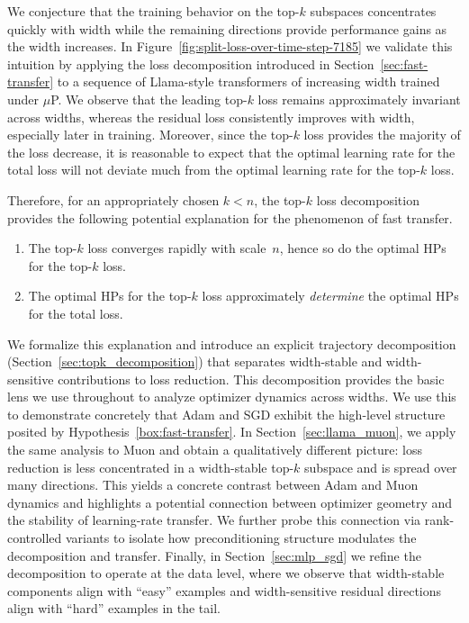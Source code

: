 We conjecture that the training behavior on the top-$k$ subspaces concentrates quickly with width while the remaining directions provide performance gains as the width increases. In Figure~\ref{fig:split-loss-over-time-step-7185} we validate this intuition by applying the loss decomposition introduced in Section~\ref{sec:fast-transfer} to a sequence of Llama-style transformers of increasing width trained under $\mu$P. We observe that the leading top-$k$ loss remains approximately invariant across widths, whereas the residual loss consistently improves with width, especially later in training. Moreover, since the top-$k$ loss provides the majority of the loss decrease, it is reasonable to expect that the optimal learning rate for the total loss will not deviate much from the optimal learning rate for the top-$k$ loss.  

Therefore, for an appropriately chosen $k < n$, the top-$k$ loss decomposition provides the following potential explanation for the phenomenon of fast transfer. 

\label{box:fast-transfer}
\begin{tcolorbox}[colback=white, colframe=gray,
  title={Hypothesis~\theidea: Fast Transfer via Loss Decomposition}]
\begin{enumerate}[leftmargin=1em,itemsep=0.2em]
    \item The top-$k$ loss converges rapidly with scale~$n$, hence so do the optimal HPs for the top-$k$ loss.
    \item The optimal HPs for the top-$k$ loss approximately \emph{determine} the optimal HPs for the total loss.
\end{enumerate}
\end{tcolorbox}
We formalize this explanation and introduce an explicit trajectory decomposition (Section~\ref{sec:topk_decomposition}) that separates width-stable and width-sensitive contributions to loss reduction. This decomposition provides the basic lens we use throughout to analyze optimizer dynamics across widths. We use this to demonstrate concretely that Adam and SGD exhibit the high-level structure posited by Hypothesis~\ref{box:fast-transfer}. In Section~\ref{sec:llama_muon}, we apply the same analysis to Muon and obtain a qualitatively different picture: loss reduction is less concentrated in a width-stable top-$k$ subspace and is spread over many directions. This yields a concrete contrast between Adam and Muon dynamics and highlights a potential connection between optimizer geometry and the stability of learning-rate transfer. We further probe this connection via rank-controlled variants to isolate how preconditioning structure modulates the decomposition and transfer. Finally, in Section~\ref{sec:mlp_sgd} we refine the decomposition to operate at the data level, where we observe that width-stable components align with ``easy'' examples and width-sensitive residual directions align with ``hard'' examples in the tail.

